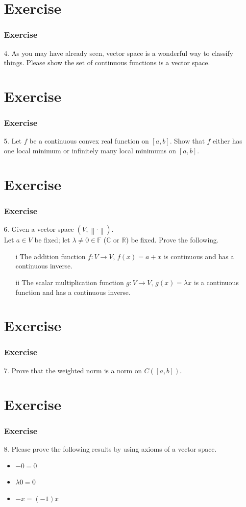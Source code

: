 \documentclass[12pt, t]{beamer}
\begin{document}
\section{Exercise}
\begin{frame}
    \frametitle{Exercise}
    4. As you may have already seen, vector space is a wonderful way to classify things. Please show the set of continuous functions is a vector space.
\end{frame}

\section{Exercise}
\begin{frame}
    \frametitle{Exercise}
    5. Let $f$ be a continuous convex real function on $[a,b]$. Show that $f$ either has one local minimum or infinitely many local minimums on $[a,b]$.
\end{frame}

\section{Exercise}
\begin{frame}
    \frametitle{Exercise}
    6. Given a vector space $(V, \left\lVert \cdot\right\rVert )$.\\
    Let $a\in V$ be fixed; let $\lambda\neq 0\in \mathbb{F}$ ($\mathbb{C}$ or $\mathbb{R}$) be fixed. Prove the following.
    \begin{enumerate}
        \item[i]    The addition function $f\colon V\to  V$, $f(x)=a+x$ is continuous and has a continuous inverse.
        \item[ii]  The scalar multiplication function $g\colon V\rightarrow V$, $g(x)=\lambda x$ is a continuous function and has a continuous inverse.
    \end{enumerate}
\end{frame}

\section{Exercise}
\begin{frame}
    \frametitle{Exercise}
    7. Prove that the weighted norm is a norm on $C([a,b])$.

\end{frame}

\section{Exercise}
\begin{frame}
    \frametitle{Exercise}
    8. Please prove the following results by using axioms of a vector space.
    \begin{itemize}
        \item $-0=0$
        \item $\lambda 0=0$
        \item $-x=(-1)x$
    \end{itemize}
\end{frame}
\end{document}
